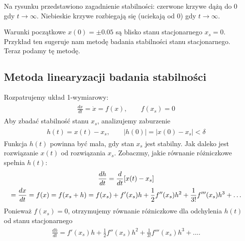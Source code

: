 \documentclass[a4paper,12pt,polish]{sphinxmanual}
\begin{document}
Na rysunku przedstawiono zagadnienie stabilności:  czerwone krzywe dążą do 0 gdy $t\to \infty$. Niebieskie  krzywe rozbiegają się (uciekają od   0) gdy $t\to \infty$.

Warunki początkowe $x(0)=\pm 0.05$ są blisko stanu stacjonarnego $x_s=0$. Przykład ten sugeruje nam metodę badania stabilności stanu stacjonarnego. Teraz podamy tę metodę.


\subsection{Metoda linearyzacji badania stabilności}
\label{ch1/chI023:metoda-linearyzacji-badania-stabilnosci}
Rozpatrujemy układ 1-wymiarowy:
\label{ch1/chI023:equation-eqn10}\begin{gather}
\begin{split}\frac{dx}{dt} = \dot x = f(x), \qquad f(x_s) = 0\end{split}\label{ch1/chI023-eqn10}
\end{gather}
Aby zbadać stabilność stanu  $x_s$, analizujemy zaburzenie
\label{ch1/chI023:equation-eqn11}\begin{gather}
\begin{split}h(t) = x(t) - x_s,  \qquad  |h(0)| = |x(0) - x_s| < \delta\end{split}\label{ch1/chI023-eqn11}
\end{gather}
Funkcja $h(t)$ powinna być mała, gdy stan $x_s$ jest stabilny. Jak daleko jest rozwiązanie $x(t)$ od rozwiązania $x_s$. Zobaczmy, jakie równanie różniczkowe spełnia $h(t)$:
\label{ch1/chI023:equation-eqn12}\begin{gather}
\begin{split}\frac{dh}{dt} = \frac{d}{dt} [x(t) - x_s]\end{split}\label{ch1/chI023-eqn12}\\\begin{split}= \frac{dx}{dt} = f(x) = f( x_s +h)  = f(x_s) + f'(x_s) h + \frac{1}{2} f''(x_s) h^2 + \frac{1}{3!} f'''(x_s) h^3+ \dots\end{split}\notag
\end{gather}
Ponieważ $f(x_s)=0$, otrzymujemy równanie różniczkowe dla odchylenia $h(t)$ od stanu stacjonarnego
\label{ch1/chI023:equation-eqn13}\begin{gather}
\begin{split}\frac{dh}{dt} =  f'(x_s) h + \frac{1}{2} f''(x_s) h^2 + \frac{1}{3!} f'''(x_s) h^3+ ....\end{split}\label{ch1/chI023-eqn13}
\end{gather}
\end{document}
